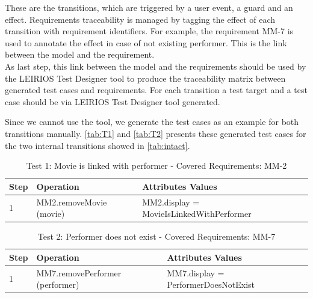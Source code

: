 These are the transitions, which are triggered by a user event, a guard and an effect. Requirements traceability is managed by tagging the effect of each transition with requirement identifiers. For example, the requirement MM-7 is used to annotate the effect in case of not existing performer. This is the link between the model and the requirement. \\
As last step, this link between the model and the requirements should be used by the LEIRIOS Test Designer tool to produce the traceability matrix between generated test cases and requirements. For each transition a test target and a test case should be via LEIRIOS Test Designer tool generated. 

Since we cannot use the tool, we generate the test cases as an example for both transitions manually. \autoref{tab:T1} and \autoref{tab:T2} presents these generated test cases for the two internal transitions showed in \autoref{tab:intact}.

\begin{table} [H] 
  \begin{center}
  \begin{small}
\caption{Test 1: Movie is linked with performer - Covered Requirements: MM-2}
\label{tab:T1}
\begin{tabular}{ m{0.8cm} | m{5cm} | m{7.3cm} }
\hline
\textbf{Step}& \textbf{Operation}&\textbf{Attributes Values}   \\
\hline
1 & MM2.removeMovie (movie)& MM2.display = MovieIsLinkedWithPerformer\\
\hline
\end{tabular}
\end{small}
 \end{center}
\end{table}


\begin{table} [H] 
\begin{center}
 \begin{small}
\caption{Test 2: Performer does not exist - Covered Requirements: MM-7}
\label{tab:T2}
\begin{tabular}{  m{0.8cm} | m{5cm} | m{7.3cm}  }
\hline
\textbf{Step}& \textbf{Operation}&\textbf{Attributes Values}   \\
\hline
1 & MM7.removePerformer (performer) & MM7.display = PerformerDoesNotExist\\
\hline
\end{tabular}
\end{small}
 \end{center}
\end{table}




